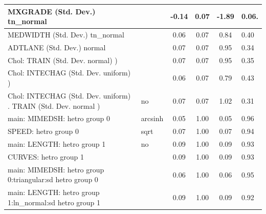 \begin{table}
\begin{center}
\begin{tabular}{|l|l|c|c|c|l|}
			\hline
			MXGRADE (Std. Dev.) tn_normal &  & -0.14 & 0.07 & -1.89 & 0.06. \\
			\hline
			MEDWIDTH (Std. Dev.) tn_normal &  & 0.06 & 0.07 & 0.84 & 0.40 \\
			\hline
			ADTLANE (Std. Dev.) normal &  & 0.07 & 0.07 & 0.95 & 0.34 \\
			\hline
			 Chol: TRAIN (Std. Dev. normal) ) &  & 0.07 & 0.07 & 0.95 & 0.35 \\
			\hline
			 Chol: INTECHAG (Std. Dev. uniform) ) &  & 0.06 & 0.07 & 0.79 & 0.43 \\
			\hline
			 Chol: INTECHAG (Std. Dev. uniform) . TRAIN (Std. Dev.   normal ) & no & 0.07 & 0.07 & 1.02 & 0.31 \\
			\hline
			main: MIMEDSH: hetro group 0 & arcsinh & 0.05 & 1.00 & 0.05 & 0.96 \\
			\hline
			SPEED: hetro group 0 & sqrt & 0.07 & 1.00 & 0.07 & 0.94 \\
			\hline
			main: LENGTH: hetro group 1 & no & 0.09 & 1.00 & 0.09 & 0.93 \\
			\hline
			CURVES: hetro group 1 &  & 0.09 & 1.00 & 0.09 & 0.93 \\
			\hline
			main: MIMEDSH: hetro group 0:triangular:sd  hetro group 0 &  & 0.06 & 1.00 & 0.06 & 0.95 \\
			\hline
			main: LENGTH: hetro group 1:ln_normal:sd  hetro group 1 &  & 0.09 & 1.00 & 0.09 & 0.92 \\
			\hline
		\end{tabular}
	\end{center}
\end{table}